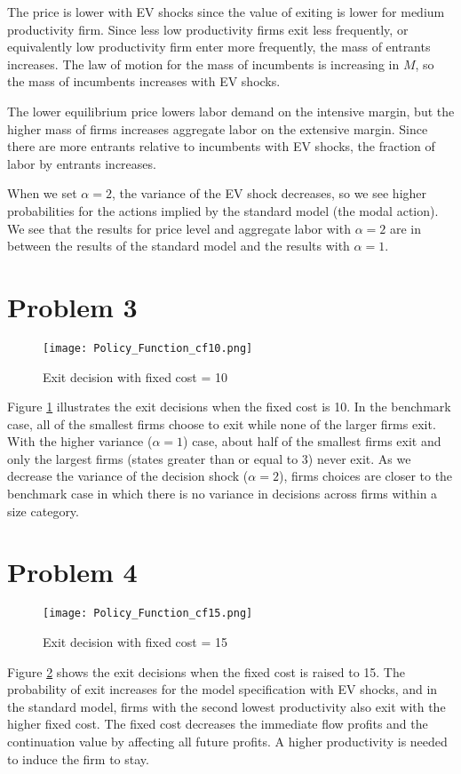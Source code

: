 \documentclass[10pt]{article}
\begin{document}
The price is lower with EV shocks since the value of exiting is lower for medium productivity firm.  Since less low productivity firms exit less frequently, or equivalently low productivity firm enter more frequently, the mass of entrants increases. The law of motion for the mass of 
incumbents is increasing in $M$, so the mass of incumbents increases with EV shocks. 

The lower equilibrium price lowers labor demand on the intensive margin, but the higher mass of firms increases aggregate labor on the extensive margin. 
Since there are more entrants relative to incumbents with EV shocks, the fraction of labor by entrants increases. 

When we set $\alpha = 2$, the variance of the EV shock decreases, so we see higher probabilities for the actions implied by the standard model (the modal action). We see that the results for price level and aggregate labor with $\alpha = 2$ are in between the results of the standard model and the results with $\alpha = 1$. 


    \section{Problem 3}

    \begin{figure}[!h]
        \centering
        \texttt{[image: Policy\_Function\_cf10.png]}
        \caption{Exit decision with fixed cost = 10}
        \label{fig1}
    \end{figure}

Figure \ref{fig1} illustrates the exit decisions when the fixed cost is 10. In the benchmark case, all of the smallest firms choose to exit while none of the larger firms exit. With the higher variance ($\alpha=1$) case, about half of the smallest firms exit and only the largest firms (states greater than or equal to 3) never exit. As we decrease the variance of the decision shock ($\alpha=2$), firms choices are closer to the benchmark case in which there is no variance in decisions across firms within a size category. 


\newpage 
    \section{Problem 4}
    \begin{figure}[!h]
        \centering
        \texttt{[image: Policy\_Function\_cf15.png]}
        \caption{Exit decision with fixed cost = 15}
        \label{fig2}
    \end{figure}

Figure \ref{fig2} shows the exit decisions when the fixed cost is raised to 15. The probability of exit increases for the model specification with EV shocks, and in the standard model, firms with the second lowest productivity also exit with the higher fixed cost. The fixed cost decreases the immediate flow profits and the continuation value 
by affecting all future profits. A higher productivity is needed to induce the firm to stay. 
\end{document}
